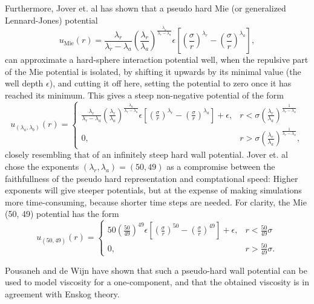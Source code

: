 Furthermore, Jover et. al \cite{jover:pseudo_hard} has shown that a pseudo hard Mie (or generalized Lennard-Jones) potential
\begin{equation}
    u_{\text{Mie}}(r) = 
        \frac{\lambda_r}{\lambda_r - \lambda_a}
        \left(\frac{\lambda_r}{\lambda_a}\right)
        ^{\frac{\lambda_a}{\lambda_r - \lambda_a}}
        \epsilon \left[
            \left(\frac{\sigma}{r}\right)^{\lambda_r} -
            \left(\frac{\sigma}{r}\right)^{\lambda_a}
        \right],
\end{equation}
can approximate a hard-sphere interaction potential well, when the repulsive part of the Mie potential is isolated, by shifting it upwards by its minimal value (the well depth $\epsilon$), and cutting it off here, setting the potential to zero once it has reached its minimum.
This gives a steep non-negative potential of the form
\begin{equation}
    u_{(\lambda_a, \lambda_b)}(r) = 
    \begin{cases}
        \frac{\lambda_r}{\lambda_r - \lambda_a}
        \left(\frac{\lambda_r}{\lambda_a}\right)
        ^{\frac{\lambda_a}{\lambda_r - \lambda_a}}
        \epsilon \left[
            \left(\frac{\sigma}{r}\right)^{\lambda_r} -
            \left(\frac{\sigma}{r}\right)^{\lambda_a}
        \right]
        + \epsilon,
            & r < \sigma \left(
                \frac{\lambda_r}{\lambda_a}
            \right)^\frac{1}{\lambda_r - \lambda_a} \\
        0,  & r > \sigma \left(
                \frac{\lambda_r}{\lambda_a}
            \right)^\frac{1}{\lambda_r - \lambda_a},
    \end{cases}
\end{equation}
closely resembling that of an infinitely steep hard wall potential.
Jover et. al chose the exponents $(\lambda_r, \lambda_a) = (50, 49)$ as a compromise between the faithfullness of the pseudo hard representation and comptational speed:
Higher exponents will give steeper potentials, but at the expense of making simulations more time-consuming, because shorter time steps are needed.
For clarity, the Mie (50, 49) potential has the form
\begin{equation}
    u_{(50, 49)}(r) = 
    \begin{cases}
        50
        \left(\frac{50}{49}\right)
        ^{49}
        \epsilon \left[
            \left(\frac{\sigma}{r}\right)^{50} -
            \left(\frac{\sigma}{r}\right)^{49}
        \right]
        + \epsilon,
            & r < \frac{50}{49} \sigma\\
        0,  & r > \frac{50}{49} \sigma.
    \end{cases}
\end{equation}

Pousaneh and de Wijn \cite{pousaneh:shear_viscosity} have shown that such a pseudo-hard wall potential can be used to model viscosity for a one-component, and that the obtained viscosity is in agreement with Enskog theory.
